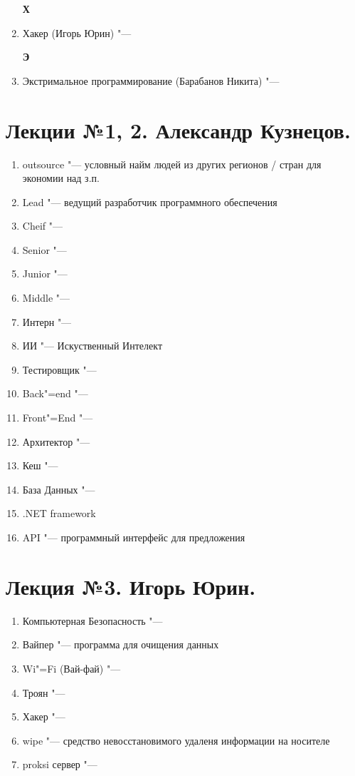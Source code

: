 \documentclass{article}
\begin{document}
\begin{enumerate}
    \textbf{Х}
    \item {Хакер (Игорь Юрин) "---}

    \textbf{Э}
    \item {Экстримальное программирование (Барабанов Никита) "---}

\end{enumerate}

\section{Лекции №1, 2. Александр Кузнецов.}
\begin{enumerate}
    \item outsource "--- условный найм людей из других регионов / стран для экономии над з.п.
    \item Lead "--- ведущий разработчик программного обеспечения
    \item Cheif "---
    \item Senior "---
    \item Junior "---
    \item Middle "---
    \item Интерн "---
    \item ИИ "--- Искуственный Интелект
    \item Тестировщик "---
    \item Back"=end "---
    \item Front"=End "---
    \item Архитектор "---
    \item Кеш "---
    \item База Данных "---
    \item .NET framework
    \item API "--- программный интерфейс для предложения
\end{enumerate}

\section{Лекция №3. Игорь Юрин.}
\begin{enumerate}
    \item Компьютерная Безопасность "---
    \item Вайпер "--- программа для очищения данных
    \item Wi"=Fi (Вай-фай) "---
    \item Троян "---
    \item Хакер "---
    \item wipe "--- средство невосстановимого удаленя информации на носителе
    \item proksi сервер "---
\end{enumerate}
\end{document}
